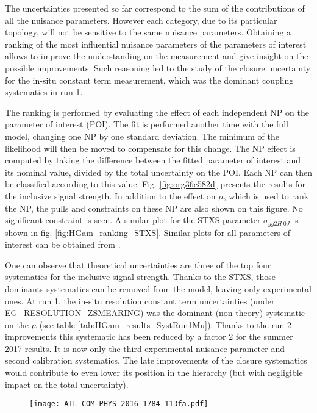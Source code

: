 \begin{enumerate}
The uncertainties presented so far correspond to the sum of the contributions of all the nuisance parameters.
However each category, due to its particular topology, will not be sensitive to the same nuisance parameters.
Obtaining a ranking of the most influential nuisance parameters of the parameters of interest allows to improve the understanding on the measurement and give insight on the possible improvements.
Such reasoning led to the study of the closure uncertainty for the in-situ constant term measurement, which was the dominant coupling systematics in run 1.

The ranking is performed by evaluating the effect of each independent NP on the parameter of interest (POI).
The fit is performed another time with the full model, changing one NP by one standard deviation.
The minimum of the likelihood will then be moved to compensate for this change.
The NP effect is computed by taking the difference between the fitted parameter of interest and its nominal value, divided by the total uncertainty on the POI.
Each NP can then be classified according to this value.
Fig. \ref{fig:org36c582d} presents the results for the inclusive signal strength.
In addition to the effect on $\mu$, which is used to rank the NP, the pulls and constraints on these NP are also shown on this figure.
No significant constraint is seen.
A similar plot for the STXS parameter $\sigma_{gg2H\ 0J}$ is shown in fig. \ref{fig:HGam_ranking_STXS}.
Similar plots for all parameters of interest can be obtained from \cite{ATL-COM-PHYS-2016-1784}.


One can observe that theoretical uncertainties are three of the top four systematics for the inclusive signal strength.
Thanks to the STXS, those dominants systematics can be removed from the model, leaving only experimental ones.
At run 1, the in-situ resolution constant term uncertainties (under EG\_RESOLUTION\_ZSMEARING) was the dominant (non theory) systematic on the $\mu$ (see table \ref{tab:HGam_results_SystRun1Mu}).
Thanks to the run 2 improvements this systematic has been reduced by a factor 2 for the summer 2017 results.
It is now only the third experimental nuisance parameter and second calibration systematics.
The late improvements of the closure systematics would contribute to even lower its position in the hierarchy (but with negligible impact on the total uncertainty).

\begin{figure}[htbp]
\centering
\texttt{[image: ATL-COM-PHYS-2016-1784\_113fa.pdf]}\\


\end{figure}
\end{enumerate}
